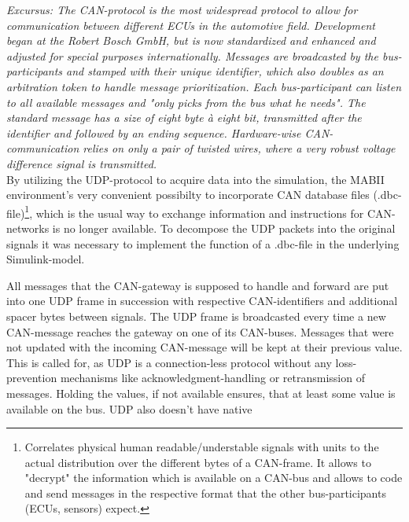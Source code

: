 \documentclass[ExampleMasters.tex]{subfiles}
\begin{document}
\textit{Excursus: The CAN-protocol is the most widespread protocol to allow for communication between different ECUs in the automotive field. Development began at the Robert Bosch GmbH, but is now standardized and enhanced and adjusted for special purposes internationally. Messages are broadcasted by the bus-participants and stamped with their unique identifier, which also doubles as an arbitration token to handle message prioritization. Each bus-participant can listen to all available messages and "only picks from the bus what he needs". The standard message has a size of eight byte \`{a} eight bit, transmitted after the identifier and followed by an ending sequence. Hardware-wise CAN-communication relies on only a pair of twisted wires, where a very robust voltage difference signal is transmitted. }\cite{CAN_intro}\\


By utilizing the UDP-protocol to acquire data into the simulation, the MABII environment's very convenient possibilty to incorporate CAN database files (.dbc-file)\footnote{Correlates physical human readable/understable signals with units to the actual distribution over the different bytes of a CAN-frame. It allows to "decrypt" the information which is available on a CAN-bus and allows to code and send messages in the respective format that the other bus-participants (ECUs, sensors) expect.}, which is the usual way to exchange information and instructions for CAN-networks is no longer available. To decompose the UDP packets into the original signals it was necessary to implement the function of a .dbc-file in the underlying Simulink-model. 

All messages that the CAN-gateway is supposed to handle and forward are put into one UDP frame in succession with respective CAN-identifiers and additional spacer bytes between signals. The UDP frame is broadcasted every time a new CAN-message reaches the gateway on one of its CAN-buses. Messages that were not updated with the incoming CAN-message will be kept at their previous value. This is called for, as UDP is a connection-less protocol without any loss-prevention mechanisms like acknowledgment-handling or retransmission of messages. Holding the values, if not available ensures, that at least some value is available on the bus. UDP also doesn't have native 
\end{document}
